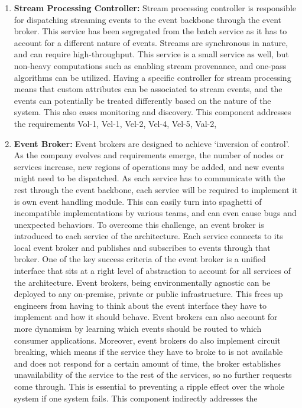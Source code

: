 \documentclass[review]{elsarticle}
\begin{document}
\begin{enumerate}
    \item \textbf{Stream Processing Controller:} Stream processing controller is responsible for dispatching streaming events to the event backbone through the event broker. This service has been segregated from the batch service as it has to account for a different nature of events. Streams are synchronous in nature, and can require high-throughput. This service is a small service as well, but non-heavy computations such as enabling stream provenance, and one-pass algorithms can be utilized. Having a specific controller for stream processing means that custom attributes can be associated to stream events, and the events can potentially be treated differently based on the nature of the system. This also eases monitoring and discovery. This component addresses the requirements Vol-1, Vel-1, Vel-2, Vel-4, Vel-5, Val-2,
    \item \textbf{Event Broker:} Event brokers are designed to achieve `inversion of control'. As the company evolves and requirements emerge, the number of nodes or services increase, new regions of operations may be added, and new events might need to be dispatched. As each service has to communicate with the rest through the event backbone, each service will be required to implement it is own event handling module. This can easily turn into spaghetti of incompatible implementations by various teams, and can even cause bugs and unexpected behaviors. To overcome this challenge, an event broker is introduced to each service of the architecture. Each service connects to its local event broker and publishes and subscribes to events through that broker. One of the key success criteria of the event broker is a unified interface that sits at a right level of abstraction to account for all services of the architecture. Event brokers, being environmentally agnostic can be deployed to any on-premise, private or public infrastructure. This frees up engineers from having to think about the event interface they have to implement and how it should behave. Event brokers can also account for more dynamism by learning which events should be routed to which consumer applications.  Moreover, event brokers do also implement circuit breaking, which means if the service they have to broke to is not available and does not respond for a certain amount of time, the broker establishes unavailability of the service to the rest of the services, so no further requests come through. This is essential to preventing a ripple effect over the whole system if one system fails. This component indirectly addresses the

\end{enumerate}
\end{document}
